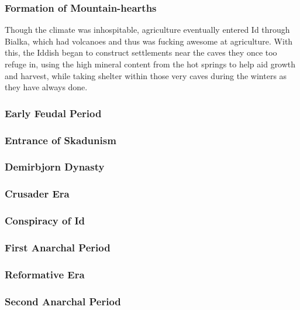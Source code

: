 		\subsubsection{Formation of Mountain-hearths}\par
			Though the climate was inhospitable, agriculture eventually entered Id through Bialka, which had volcanoes and thus was fucking awesome at agriculture. With this, the Iddish began to construct settlements near the caves they once too refuge in, using the high mineral content from the hot springs to help aid growth and harvest, while taking shelter within those very caves during the winters as they have always done.
		\subsubsection{Early Feudal Period}\par
		\subsubsection{Entrance of Skadunism}\par
		\subsubsection{Demirbjorn Dynasty}\par
		\subsubsection{Crusader Era}\par
		\subsubsection{Conspiracy of Id}\par
		\subsubsection{First Anarchal Period}\par
		\subsubsection{Reformative Era}\par
		\subsubsection{Second Anarchal Period}\par

